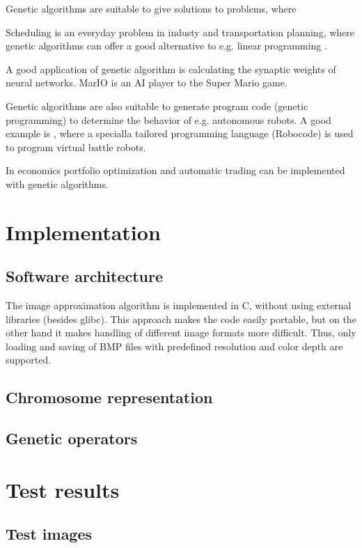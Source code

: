 \documentclass[conference]{IEEEtran}
\begin{document}
Genetic algorithms are suitable to give solutions to
problems, where 

Scheduling is an everyday problem in industy and transportation
planning, where genetic algorithms can offer a good alternative
to e.g. linear programming \cite{ga-transport}.

A good application of genetic algorithm is calculating
the synaptic weights of neural networks. MarIO \cite{mar-io}
is an AI player to the Super Mario game.

Genetic algorithms are also suitable to generate program code
(genetic programming) to determine the behavior of e.g.
autonomous robots. A good example is \cite{ga-robocode},
where a specialla tailored programming language (Robocode)
is used to program virtual battle robots.

In economics portfolio optimization \cite{ga-portfolio}
and automatic trading \cite{ga-trading}
can be implemented with genetic algorithms.

\section{Implementation}

\subsection{Software architecture}

The image approximation algorithm is implemented in C,
without using external libraries (besides glibc). This
approach makes the code easily portable, but on the other
hand it makes handling of different image formats more
difficult. Thus, only loading and saving of BMP files
with predefined resolution and color depth are supported.

\subsection{Chromosome representation}

\subsection{Genetic operators}


\section{Test results}

\subsection{Test images}
\end{document}
